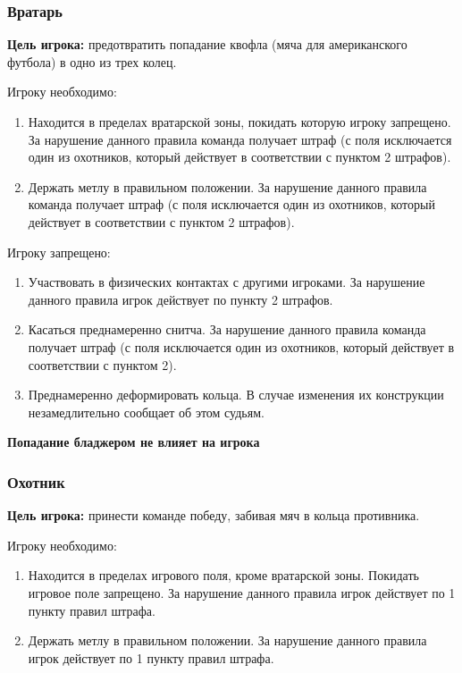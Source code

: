 \subsubsection*{Вратарь}
\par\textbf{Цель игрока:} предотвратить попадание квофла (мяча для американского футбола) в одно из трех колец.
\par Игроку необходимо:
\begin{enumerate}
\item Находится в пределах вратарской зоны, покидать которую игроку запрещено. За нарушение данного правила команда получает штраф (с поля исключается один из охотников, который действует в соответствии с пунктом 2 штрафов).
\item Держать метлу в правильном положении. За нарушение данного правила команда получает штраф (с поля исключается один из охотников, который действует в соответствии с пунктом 2 штрафов).
\end{enumerate}

\par Игроку запрещено:
\begin{enumerate}
\item Участвовать в физических контактах с другими игроками. За нарушение данного правила игрок действует по пункту 2 штрафов.
\item Касаться преднамеренно снитча. За нарушение данного правила команда получает штраф (с поля исключается один из охотников, который действует в соответствии с пунктом 2).
\item Преднамеренно деформировать кольца. В случае изменения их конструкции незамедлительно сообщает об этом судьям.
\end{enumerate}
\par\textbf{Попадание бладжером не влияет на игрока}


\subsubsection*{Охотник}
\par\textbf{Цель игрока:} принести команде победу, забивая мяч в кольца противника.
\par Игроку необходимо:
\begin{enumerate}
\item Находится в пределах игрового поля, кроме вратарской зоны. Покидать игровое поле запрещено. За нарушение данного правила игрок действует по 1 пункту правил штрафа.
\item Держать метлу в правильном положении. За нарушение данного правила игрок действует по 1 пункту правил штрафа.
\end{enumerate}

